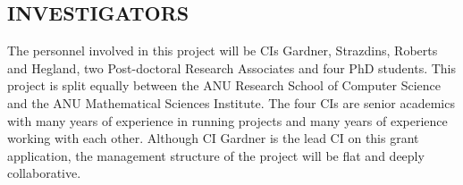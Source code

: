 \iffalse
\subsection*{ROLE OF PERSONNEL}
\fi
\subsection*{INVESTIGATORS}


%


The personnel involved in this project will be CIs Gardner, Strazdins,
Roberts and Hegland, two Post-doctoral Research Associates and four
PhD students. This project is split equally between the ANU Research
School of Computer Science and the ANU Mathematical Sciences
Institute. The four CIs are senior academics with many years of
experience in running projects and many years of experience working
with each other. Although CI Gardner is the lead CI on this grant
application, the management structure of the project will be flat and
deeply collaborative.


